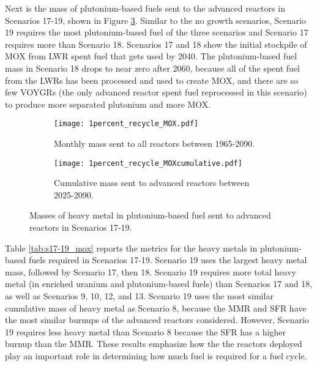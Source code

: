 Next is the mass of plutonium-based fuels sent to the advanced reactors 
in Scenarios 17-19, shown in Figure \ref{fig:1percent_recycle_mox}.
Similar to the no growth scenarios, Scenario 19 requires the most 
plutonium-based fuel of the three scenarios and Scenario 17 
requires more than Scenario 18. Scenarios 17 and 18 show the 
initial stockpile of \gls{MOX} from \gls{LWR} spent fuel that 
gets used by 2040. The plutonium-based fuel mass in Scenario 18 
drops to near zero after 2060, because all of the spent fuel from 
the \glspl{LWR} has been processed and used to create \gls{MOX}, 
and there are so few VOYGRs (the only advanced reactor spent fuel 
reprocessed in this scenario) to produce more separated plutonium 
and more \gls{MOX}. 

\begin{figure}[h!]
    \centering
    \begin{subfigure}[b]{0.45\textwidth}
        \centering
        \texttt{[image: 1percent\_recycle\_MOX.pdf]}
        \caption{Monthly mass sent to all reactors 
        between 1965-2090.}
        \label{fig:1percent_recycle_AR_mox}
    \end{subfigure}
    \hfill
    \begin{subfigure}[b]{0.45\textwidth}
        \centering
        \texttt{[image: 1percent\_recycle\_MOXcumulative.pdf]}
        \caption{Cumulative mass  
        sent to advanced reactors between 2025-2090.}
        \label{fig:1percent_recycle_mox_cumulative}
    \end{subfigure}
       \caption{Masses of heavy metal in plutonium-based fuel 
        sent to advanced reactors
        in Scenarios 17-19.}
       \label{fig:1percent_recycle_mox}
\end{figure}

Table \ref{tab:s17-19_mox} reports the metrics for the
heavy metals in plutonium-based 
fuels required in Scenarios 17-19. Scenario 19 uses the largest 
heavy metal mass, followed by Scenario 17, then 18. 
Scenario 19 requires more total heavy metal (in enriched 
uranium and plutonium-based fuels) than Scenarios 
17 and 18, as well as Scenarios 9, 10, 12, and 13. Scenario 19 
uses the most similar cumulative mass of heavy metal as Scenario 8, 
because the \gls{MMR} and \gls{SFR} have the most similar burnups 
of the advanced reactors considered. However, Scenario 19 requires 
less heavy metal than Scenario 8 because the \gls{SFR} has a higher 
burnup than the \gls{MMR}. These results emphasize how the 
the reactors deployed play an important role in determining how 
much fuel is required for a fuel cycle.  

